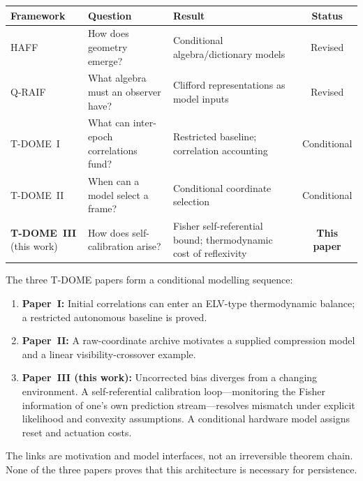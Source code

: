 \documentclass[12pt,a4paper,openany]{book}
\begin{document}
\begin{center}
\small
\setlength{\tabcolsep}{4pt}%
\begin{tabular}{@{}lP{3.5cm}P{4.2cm}c@{}}
\toprule
\textbf{Framework} & \textbf{Question} & \textbf{Result}
  & \textbf{Status} \\
\midrule
HAFF~\cite{Liu2026HAFF_A,Liu2026HAFF_B}
  & How does geometry emerge?
  & Conditional algebra/dictionary models
  & Revised \\[3pt]
Q-RAIF~\cite{Liu2026QRAIF_A,Liu2026QRAIF_B}
  & What algebra must an observer have?
  & Clifford representations as model inputs
  & Revised \\[3pt]
T-DOME~I~\cite{Liu2026TDOME_I}
  & What can inter-epoch correlations fund?
  & Restricted baseline; correlation accounting
  & Conditional \\[3pt]
T-DOME~II~\cite{Liu2026TDOME_II}
  & When can a model select a frame?
  & Conditional coordinate selection
  & Conditional \\[3pt]
\textbf{T-DOME~III} (this work)
  & How does self-calibration arise?
  & Fisher self-referential bound;
    thermodynamic cost of reflexivity
  & \textbf{This paper} \\
\bottomrule
\end{tabular}
\end{center}

The three T-DOME papers form a conditional modelling sequence:
\begin{enumerate}
\item \textbf{Paper~I:} Initial correlations can enter an ELV-type
  thermodynamic balance; a restricted autonomous baseline is proved.
\item \textbf{Paper~II:} A raw-coordinate archive motivates a supplied
  compression model and a linear visibility-crossover example.
\item \textbf{Paper~III (this work):} Uncorrected
  bias diverges from a changing environment.
  A self-referential calibration loop---monitoring the
  Fisher information of one's own prediction stream---resolves
  mismatch under explicit likelihood and convexity assumptions.  A
  conditional hardware model assigns reset and actuation costs.
\end{enumerate}

The links are motivation and model interfaces, not an irreversible
theorem chain.  None of the three papers proves that this architecture
is necessary for persistence.

\end{document}
